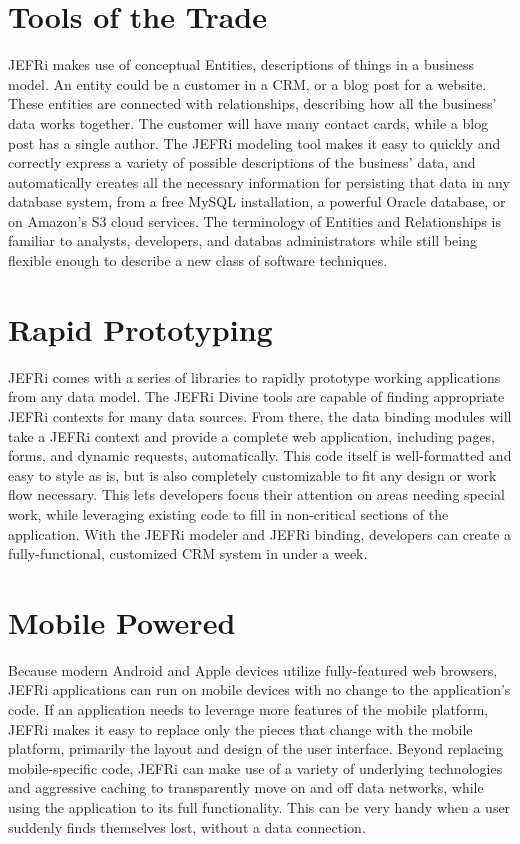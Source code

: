 \documentclass{article}
\begin{document}
\section{Tools of the Trade}
JEFRi makes use of conceptual Entities, descriptions of things in a business
model. An entity could be a customer in a CRM, or a blog post for a website.
These entities are connected with relationships, describing how all the
business' data works together. The customer will have many contact cards, while
a blog post has a single author. The JEFRi modeling tool makes it easy to
quickly and correctly express a variety of possible descriptions of the
business' data, and automatically creates all the necessary information for
persisting that data in any database system, from a free MySQL installation, a
powerful Oracle database, or on Amazon's S3 cloud services. The terminology of
Entities and Relationships is familiar to analysts, developers, and databas
administrators while still being flexible enough to describe a new class of
software techniques.

\section{Rapid Prototyping}
JEFRi comes with a series of libraries to rapidly prototype working
applications from any data model. The JEFRi Divine tools are capable of
finding appropriate JEFRi contexts for many data sources. From there, the data
binding modules will take a JEFRi context and provide a complete web
application, including pages, forms, and dynamic requests, automatically. This
code itself is well-formatted and easy to style as is, but is also completely
customizable to fit any design or work flow necessary. This lets developers
focus their attention on areas needing special work, while leveraging existing
code to fill in non-critical sections of the application. With the JEFRi
modeler and JEFRi binding, developers can create a fully-functional,
customized CRM system in under a week.

\section{Mobile Powered}
Because modern Android and Apple devices utilize fully-featured web browsers,
JEFRi applications can run on mobile devices with no change to the
application's code. If an application needs to leverage more features of the
mobile platform, JEFRi makes it easy to replace only the pieces that change
with the mobile platform, primarily the layout and design of the user
interface. Beyond replacing mobile-specific code, JEFRi can make use of a
variety of underlying technologies and aggressive caching to transparently
move on and off data networks, while using the application to its full
functionality. This can be very handy when a user suddenly finds themselves
lost, without a data connection.
\end{document}
